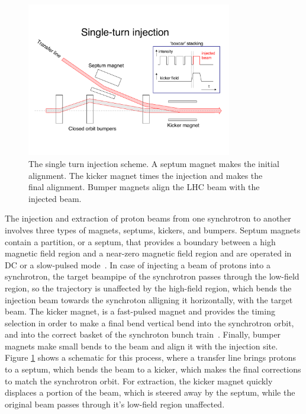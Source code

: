 \begin{figure}[h]
   \centering
  \includegraphics[width=0.8\textwidth]{Figures/LHC_Diagrams/LHC_SingleTurnInjection.pdf}
  \caption{The single turn injection scheme.  A septum magnet makes
    the initial alignment.  The kicker magnet times the injection and
    makes the final alignment.  Bumper magnets align the LHC beam with
  the injected beam.} \label{fig:lhc_singleTurnInjection}
\end{figure}

\par The injection and extraction of proton beams from one synchrotron
to another involves three types of magnets, septums, kickers, and
bumpers.  Septum magnets contain a partition, or a septum, that
provides a boundary between a high magnetic field region and a
near-zero magnetic field region and are operated in DC or a
slow-pulsed mode~\cite{LHC:LHC_septums_Barnes}.  In case of injecting
a beam of protons into a synchrotron, the target beampipe of the synchrotron
passes through the low-field region, so the trajectory is unaffected
by the high-field region, which bends the injection beam towards the
synchroton alligning it horizontally, with the target beam.  The
kicker magnet, is a fast-pulsed magnet and provides the timing
selection in order to make a final bend vertical bend into the
synchrotron orbit, and into the correct basket of the synchroton bunch 
train~\cite{LHC:LHC_kickers_Barnes}.  Finally, bumper magnets make
small bends to the beam and align it with the injection site.  Figure
\ref{fig:lhc_singleTurnInjection} shows a schematic for this process,
where a transfer line brings protons to a septum, which bends the beam
to a kicker, which makes the final corrections to match the
synchrotron orbit.  For extraction, the kicker magnet quickly
displaces a portion of the beam, which is steered away by the septum,
while the original beam passes through it's low-field region 
unaffected.   

